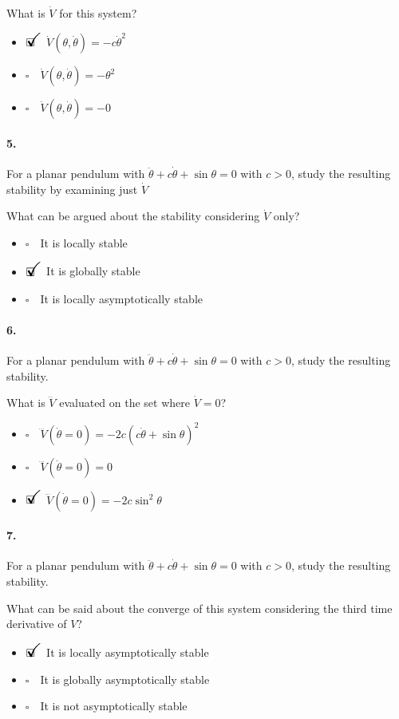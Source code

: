 \documentclass[12pt, a4paper]{article}
\newcommand{\ans}{\item[]$\rlap{\LARGE{\checkmark}}\square\quad$}
\newcommand{\noans}{\item[]$\square\quad$}
\begin{document}
What is $\dot{V}$ for this system?

\begin{itemize}
    \ans $\dot{V}(\theta, \dot{\theta}) = -c\dot{\theta}^{2}$
    \noans $\dot{V}(\theta, \dot{\theta}) = -\theta^{2}$
    \noans $\dot{V}(\theta, \dot{\theta}) = -0$
\end{itemize}

\paragraph{5.}
For a planar pendulum with $\ddot{\theta}+c\dot{\theta}+\sin\theta = 0$ with $c>0$, study the resulting stability by examining just $\dot{V}$ \medskip

What can be argued about the stability considering $\dot{V}$ only?
\begin{itemize}
    \noans It is locally stable
    \ans It is globally stable
    \noans It is locally asymptotically stable
\end{itemize}

\paragraph{6.}
For a planar pendulum with $\ddot{\theta}+c\dot{\theta}+\sin\theta = 0$ with $c>0$, study the resulting stability. \medskip

What is $\dddot{V}$ evaluated on the set where $\dot{V}=0$?

\begin{itemize}
    \noans $\dddot{V}(\dot{\theta}=0) = -2c(c\dot{\theta}+\sin\theta)^{2}$
    \noans $\dddot{V}(\dot{\theta}=0) = 0$
    \ans $\dddot{V}(\dot{\theta}=0) = -2c\sin^{2}\theta$
\end{itemize}

\paragraph{7.}
For a planar pendulum with $\ddot{\theta}+c\dot{\theta}+\sin\theta = 0$ with $c>0$, study the resulting stability. \medskip

What can be said about the converge of this system considering the third time derivative of $V$?

\begin{itemize}
    \ans It is locally asymptotically stable
    \noans It is globally asymptotically stable
    \noans It is not asymptotically stable
\end{itemize}
\end{document}
